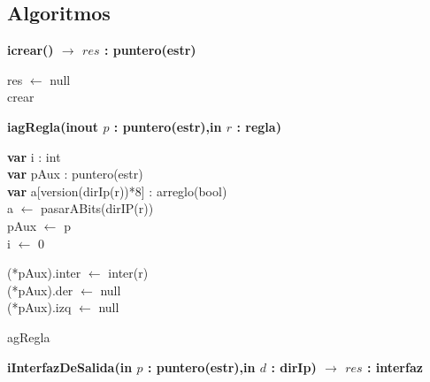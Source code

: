 \subsection*{Algoritmos}

\textbf{icrear()   $\longrightarrow$	$res$ : puntero(estr)
}
    \incmargin{1em}
    \linesnumbered
    \dontprintsemicolon
    
	\begin{algorithm}[H]
	
	
	res $\leftarrow$ null\\

 \caption{crear}
   \end{algorithm}


\textbf{iagRegla(inout $p$ : puntero(estr),in $r$ : regla)
}
    \incmargin{1em}
    \linesnumbered
    \dontprintsemicolon
    
	\begin{algorithm}[H]
	
	
\textbf{var} i : int\\
\textbf{var} pAux : puntero(estr) 	\\
\textbf{var} a[version(dirIp(r))*8] : arreglo(bool) 	\\
\BlankLine 
{}
\BlankLine 
a $\leftarrow$ pasarABits(dirIP(r))\\
pAux $\leftarrow$ p\\
i $\leftarrow$ 0

\BlankLine 

\BlankLine 
{}
\BlankLine 
(*pAux).inter $\leftarrow$ inter(r)\\
(*pAux).der $\leftarrow$ null\\
(*pAux).izq $\leftarrow$ null

 \caption{agRegla}
   \end{algorithm}






\textbf{iInterfazDeSalida(in $p$ : puntero(estr),in $d$ : dirIp)   $\longrightarrow$	$res$ : interfaz
}
    \incmargin{1em}
    \linesnumbered
    \dontprintsemicolon
    

